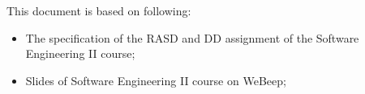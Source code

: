 This document is based on following:
\begin{itemize}
    \item The specification of the RASD and DD assignment of the Software Engineering II course;
    \item Slides of Software Engineering II course on WeBeep; 
\end{itemize}